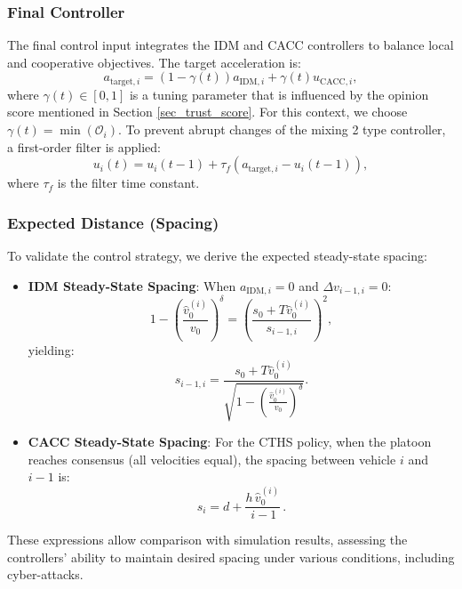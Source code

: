 \documentclass[letterpaper, 10pt, conference]{ieeeconf}  %
\begin{document}
\subsubsection{Final Controller}
The final control input integrates the IDM and CACC controllers to balance local and cooperative objectives. The target acceleration is:
\begin{equation}
    a_{\text{target},i} = (1 - \gamma(t)) a_{\text{IDM},i} + \gamma(t) u_{\text{CACC},i},
\end{equation}
where \(\gamma(t) \in [0,1]\) is a tuning parameter that is influenced by the opinion score mentioned in Section \ref{sec_trust_score}. For this context, we choose \(\gamma(t) = \min(\mathcal{O}_i)\).
To prevent abrupt changes of the mixing 2 type controller, a first-order filter is applied:
\begin{equation}
    u_i(t) = u_i(t-1) + \tau_f (a_{\text{target},i} - u_i(t-1)),
\end{equation}
where $\tau_f$ is the filter time constant. 


\subsubsection{Expected Distance (Spacing)}
To validate the control strategy, we derive the expected steady-state spacing:
\begin{itemize}
    \item \textbf{IDM Steady-State Spacing}: When $a_{\text{IDM},i} = 0$ and $\Delta v_{i-1,i} = 0$:
    \[
    1 - \left( \frac{\hat{v}_0^{(i)}}{v_0} \right)^\delta = \left( \frac{s_0 + T \hat{v}_0^{(i)}}{s_{i-1,i}} \right)^2,
    \]
    yielding:
    \[
    s_{i-1,i} = \frac{s_0 + T \hat{v}_0^{(i)}}{\sqrt{1 - \left( \frac{\hat{v}_0^{(i)}}{v_0} \right)^\delta}}.
    \]
    \item \textbf{CACC Steady-State Spacing}: For the CTHS policy, when the platoon reaches consensus (all velocities equal), the spacing between vehicle $i$ and $i-1$ is:
    \[
    \boxed{s_i = d + \frac{h\,\hat{v}_0^{(i)}}{\,i-1}\,.}
    \]
\end{itemize}
These expressions allow comparison with simulation results, assessing the controllers' ability to maintain desired spacing under various conditions, including cyber-attacks.
\end{document}
